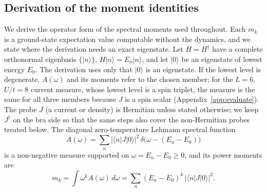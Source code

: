 \documentclass[submission, PhysCore]{SciPost}
\begin{document}
\FloatBarrier
\begin{appendix}
\section{Derivation of the moment identities}
\label{app:moments}
We derive the operator form of the spectral moments used throughout. Each $m_k$ is a ground-state expectation value computable without the dynamics, and we state where the derivation needs an exact eigenstate. Let $H=H^\dagger$ have a complete orthonormal eigenbasis $\{|n\rangle\}$, ${H|n\rangle=E_n|n\rangle}$, and let $|0\rangle$ be an eigenstate of lowest energy $E_0$. The derivation uses only that $|0\rangle$ is an eigenstate. If the lowest level is degenerate, $A(\omega)$ and its moments refer to the chosen member; for the $L=6$, $U/t=8$ current measure, whose lowest level is a spin triplet, the measure is the same for all three members because $J$ is a spin scalar (Appendix~\ref{app:evaluate}). The probe $J$ (a current or density) is Hermitian unless stated otherwise; we keep $J^\dagger$ on the bra side so that the same steps also cover the non-Hermitian probes treated below. The diagonal zero-temperature Lehmann spectral function
\begin{equation}
A(\omega)=\sum_n |\langle n|J|0\rangle|^2\,\delta\!\big(\omega-(E_n-E_0)\big)
\label{eq:app-lehmann}
\end{equation}
is a non-negative measure supported on $\omega=E_n-E_0\ge 0$, and its power moments are
\[
m_k=\int\omega^k A(\omega)\,d\omega=\sum_n(E_n-E_0)^k\,|\langle n|J|0\rangle|^2 .
\]


\end{appendix}
\end{document}
